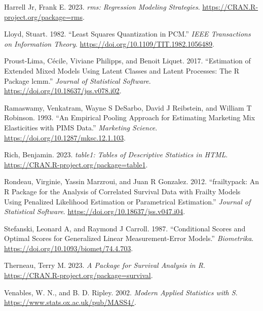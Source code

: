 \begin{CSLReferences}{1}{0}
\leavevmode{}%
Harrell Jr, Frank E. 2023. \emph{{rms}: Regression Modeling Strategies}. \url{https://CRAN.R-project.org/package=rms}.

\leavevmode{}%
Lloyd, Stuart. 1982. {``Least Squares Quantization in {PCM}.''} \emph{IEEE Transactions on Information Theory}. \url{https://doi.org/10.1109/TIT.1982.1056489}.

\leavevmode{}%
Proust-Lima, Cécile, Viviane Philipps, and Benoit Liquet. 2017. {``Estimation of Extended Mixed Models Using Latent Classes and Latent Processes: The {R} Package {lcmm}.''} \emph{Journal of Statistical Software}. \url{https://doi.org/10.18637/jss.v078.i02}.

\leavevmode{}%
Ramaswamy, Venkatram, Wayne S DeSarbo, David J Reibstein, and William T Robinson. 1993. {``An Empirical Pooling Approach for Estimating Marketing Mix Elasticities with {PIMS} Data.''} \emph{Marketing Science}. \url{https://doi.org/10.1287/mksc.12.1.103}.

\leavevmode{}%
Rich, Benjamin. 2023. \emph{{table1}: Tables of Descriptive Statistics in {HTML}}. \url{https://CRAN.R-project.org/package=table1}.

\leavevmode{}%
Rondeau, Virginie, Yassin Marzroui, and Juan R Gonzalez. 2012. {``{frailtypack}: An {R} Package for the Analysis of Correlated Survival Data with Frailty Models Using Penalized Likelihood Estimation or Parametrical Estimation.''} \emph{Journal of Statistical Software}. \url{https://doi.org/10.18637/jss.v047.i04}.

\leavevmode{}%
Stefanski, Leonard A, and Raymond J Carroll. 1987. {``Conditional Scores and Optimal Scores for Generalized Linear Measurement-Error Models.''} \emph{Biometrika}. \url{https://doi.org/10.1093/biomet/74.4.703}.

\leavevmode{}%
Therneau, Terry M. 2023. \emph{A Package for Survival Analysis in {R}}. \url{https://CRAN.R-project.org/package=survival}.

\leavevmode{}%
Venables, W. N., and B. D. Ripley. 2002. \emph{Modern Applied Statistics with {S}}. \url{https://www.stats.ox.ac.uk/pub/MASS4/}.


\end{CSLReferences}
